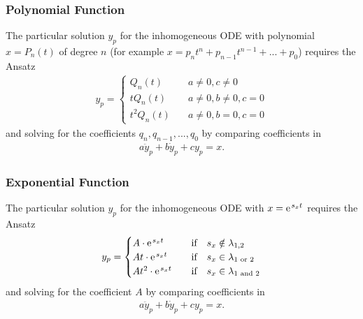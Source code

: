 \documentclass[a4paper,11pt,oneside]{scrartcl}
\begin{document}
\subsubsection{Polynomial Function}
The particular solution $y_p$ for the inhomogeneous ODE with
polynomial $x = P_n(t)$ of degree $n$
(for example $x = p_n t^n + p_{n-1} t^{n-1} + ... +p_0$)
requires the Ansatz
\begin{align}
y_p =
\begin{cases}
Q_n(t)&\quad a\neq 0, c\neq 0\\
t Q_n(t)&\quad a\neq 0, b\neq 0, c=0\\
t^2 Q_n(t)&\quad a\neq 0, b=0, c=0
\end{cases}
\end{align}
and solving for the coefficients $q_n, q_{n-1},...,q_0$ by comparing
coefficients in
\begin{align}
a \ddot{y}_p + b \dot{y}_p + c y_p = x.
\end{align}


\subsubsection{Exponential Function}
The particular solution $y_p$ for the inhomogeneous ODE with
$x = \e^{s_x t}$
requires the Ansatz
\begin{align}
y_p =
\begin{cases}
A \cdot \e^{s_x t}&\quad \text{if} \quad  s_x \notin \lambda_{1,2}\\
A t \cdot \e^{s_x t}&\quad \text{if} \quad s_x \in \lambda_{1 \text{ or } 2}\\
A t^2 \cdot \e^{s_x t}&\quad \text{if} \quad s_x \in \lambda_{1 \text{ and } 2}
\end{cases}
\end{align}
and solving for the coefficient $A$ by comparing coefficients
in
\begin{align}
a \ddot{y}_p + b \dot{y}_p + c y_p = x.
\end{align}



\end{document}
